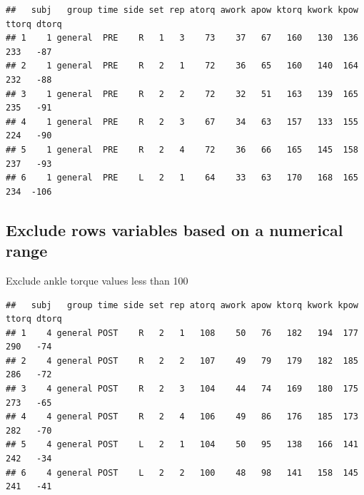 \documentclass[
]{book}
\newenvironment{Shaded}{\begin{snugshade}}{\end{snugshade}}
\newcommand{\CommentTok}[1]{\textcolor[rgb]{0.56,0.35,0.01}{\textit{#1}}}
\newcommand{\DecValTok}[1]{\textcolor[rgb]{0.00,0.00,0.81}{#1}}
\newcommand{\KeywordTok}[1]{\textcolor[rgb]{0.13,0.29,0.53}{\textbf{#1}}}
\newcommand{\NormalTok}[1]{#1}
\newcommand{\OperatorTok}[1]{\textcolor[rgb]{0.81,0.36,0.00}{\textbf{#1}}}
\newcommand{\StringTok}[1]{\textcolor[rgb]{0.31,0.60,0.02}{#1}}
\begin{document}
\begin{Shaded}
\end{Shaded}

\begin{verbatim}
##   subj   group time side set rep atorq awork apow ktorq kwork kpow ttorq dtorq
## 1    1 general  PRE    R   1   3    73    37   67   160   130  136   233   -87
## 2    1 general  PRE    R   2   1    72    36   65   160   140  164   232   -88
## 3    1 general  PRE    R   2   2    72    32   51   163   139  165   235   -91
## 4    1 general  PRE    R   2   3    67    34   63   157   133  155   224   -90
## 5    1 general  PRE    R   2   4    72    36   66   165   145  158   237   -93
## 6    1 general  PRE    L   2   1    64    33   63   170   168  165   234  -106
\end{verbatim}

\hypertarget{exclude-rows-variables-based-on-a-numerical-range}{%
\subsection{Exclude rows variables based on a numerical range}\label{exclude-rows-variables-based-on-a-numerical-range}}

Exclude ankle torque values less than 100

\begin{Shaded}
\end{Shaded}

\begin{verbatim}
##   subj   group time side set rep atorq awork apow ktorq kwork kpow ttorq dtorq
## 1    4 general POST    R   2   1   108    50   76   182   194  177   290   -74
## 2    4 general POST    R   2   2   107    49   79   179   182  185   286   -72
## 3    4 general POST    R   2   3   104    44   74   169   180  175   273   -65
## 4    4 general POST    R   2   4   106    49   86   176   185  173   282   -70
## 5    4 general POST    L   2   1   104    50   95   138   166  141   242   -34
## 6    4 general POST    L   2   2   100    48   98   141   158  145   241   -41
\end{verbatim}
\end{document}
